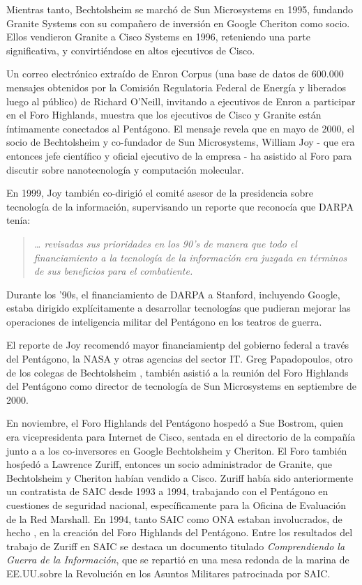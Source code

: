 \documentclass[10pt,a5paper,twoside,spanish,]{book}
\begin{document}
Mientras tanto, Bechtolsheim se marchó de Sun Microsystems en 1995,
fundando Granite Systems con su compañero de inversión en Google
Cheriton como socio. Ellos vendieron Granite a Cisco Systems en 1996,
reteniendo una parte significativa, y convirtiéndose en altos ejecutivos
de Cisco.

Un correo electrónico extraído de Enron Corpus (una base de datos de
600.000 mensajes obtenidos por la Comisión Regulatoria Federal de
Energía y liberados luego al público) de Richard O'Neill, invitando a
ejecutivos de Enron a participar en el Foro Highlands, muestra que los
ejecutivos de Cisco y Granite están íntimamente conectados al Pentágono.
El mensaje revela que en mayo de 2000, el socio de Bechtolsheim y
co-fundador de Sun Microsystems, William Joy - que era entonces jefe
científico y oficial ejecutivo de la empresa - ha asistido al Foro para
discutir sobre nanotecnología y computación molecular.

En 1999, Joy también co-dirigió el comité asesor de la presidencia sobre
tecnología de la información, supervisando un reporte que reconocía que
DARPA tenía:

\begin{quote}
\emph{\ldots{} revisadas sus prioridades en los 90's de manera que todo
el financiamiento a la tecnología de la información era juzgada en
términos de sus beneficios para el combatiente.}
\end{quote}

Durante los '90s, el financiamiento de DARPA a Stanford, incluyendo
Google, estaba dirigido explícitamente a desarrollar tecnologías que
pudieran mejorar las operaciones de inteligencia militar del Pentágono
en los teatros de guerra.

El reporte de Joy recomendó mayor financiamientp del gobierno federal a
través del Pentágono, la NASA y otras agencias del sector IT. Greg
Papadopoulos, otro de los colegas de Bechtolsheim , también asistió a la
reunión del Foro Highlands del Pentágono como director de tecnología de
Sun Microsystems en septiembre de 2000.

En noviembre, el Foro Highlands del Pentágono hospedó a Sue Bostrom,
quien era vicepresidenta para Internet de Cisco, sentada en el
directorio de la compañía junto a a los co-inversores en Google
Bechtolsheim y Cheriton. El Foro también hosṕedó a Lawrence Zuriff,
entonces un socio administrador de Granite, que Bechtolsheim y Cheriton
habían vendido a Cisco. Zuriff había sido anteriormente un contratista
de SAIC desde 1993 a 1994, trabajando con el Pentágono en cuestiones de
seguridad nacional, específicamente para la Oficina de Evaluación de la
Red Marshall. En 1994, tanto SAIC como ONA estaban involucrados, de
hecho , en la creación del Foro Highlands del Pentágono. Entre los
resultados del trabajo de Zuriff en SAIC se destaca un documento
titulado \emph{Comprendiendo la Guerra de la Información}, que se
repartió en una mesa redonda de la marina de EE.UU.sobre la Revolución
en los Asuntos Militares patrocinada por SAIC.
\end{document}
